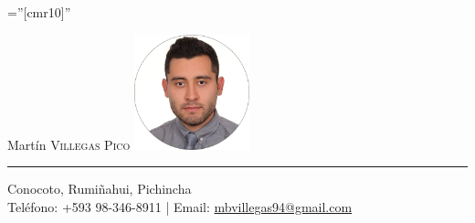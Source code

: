 \documentclass[a4paper,10.9pt]{article}
\begin{document}
  




\font\fb=''[cmr10]'' %


{ \Huge Martín \textsc{Villegas Pico}}\hfill
\includegraphics[width=9em]{img/martin.png} \\
\textcolor{black!30}{\rule[.1\baselineskip]{\textwidth}{1pt}}

\begin{center}
Conocoto, Rumiñahui, Pichincha\\
Teléfono: +593 98-346-8911 | Email: \href{mailto:mbvillegas94@gmail.com}{mbvillegas94@gmail.com}
\end{center}


%
\end{document}
